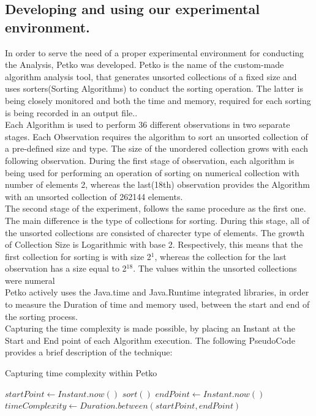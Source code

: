 \documentclass[]{report}
\begin{document}
	\subsection{Developing and using our experimental environment.}
	In order to serve the need of a proper experimental environment  for conducting the Analysis, Petko was developed. Petko is the name of the custom-made  algorithm analysis tool, that generates unsorted collections of a fixed size and uses sorters(Sorting Algorithms) to conduct the sorting operation. The latter is being closely monitored and both the time and memory, required for each sorting is being recorded in an output file.. \\
	Each Algorithm is used to perform 36 different observations in two separate stages. Each Observation requires the algorithm to sort an unsorted collection of a pre-defined size and type. The size of the unordered collection grows with each following observation. During the first stage of observation, each algorithm is being used for performing an operation of sorting on numerical collection with number of elements 2, whereas the last(18th) observation provides the Algorithm with an unsorted collection of 262144 elements. \\
	The second stage of the experiment, follows the same procedure as the first one. The main difference is the type of collections for sorting. During this stage, all of the unsorted collections are consisted of charecter type of elements.
	 The growth of Collection Size is Logarithmic with base 2. Respectively, this means that the first collection for sorting is with size 2$^{1}$, whereas the collection for the last observation has a size equal to 2$^{18}$. The values within the unsorted collections were numeral\\
	Petko actively uses the Java.time and Java.Runtime integrated libraries, in order to measure the Duration of time and memory used, between the start and end of the sorting process. \\
	Capturing the time complexity is made possible, by placing an Instant at the Start and End point of each Algorithm execution. The following PseudoCode provides a brief description of the technique:
	

\begin{algorithm}
	\caption{Capturing time complexity within Petko}\label{alg:cap}
	\begin{algorithmic}
	\State $startPoint \gets Instant.now()$       
	\State $sort()$ 
	\State $endPoint \gets Instant.now()$  
	\State $timeComplexity \gets Duration.between(startPoint, endPoint)$
	\end{algorithmic}
\end{algorithm}
\end{document}
